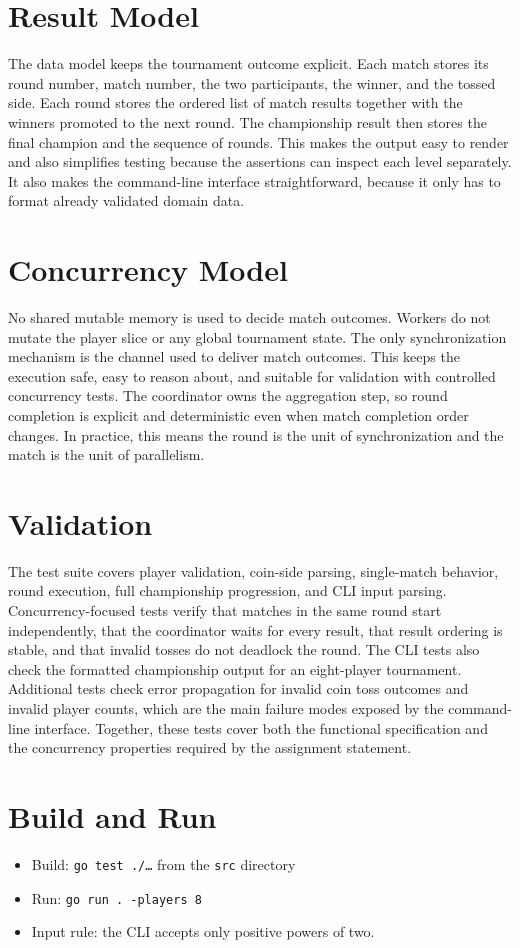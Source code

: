 \documentclass[11pt,a4paper]{article}
\begin{document}
\section*{Result Model}
The data model keeps the tournament outcome explicit.
Each match stores its round number, match number, the two participants, the winner, and the tossed side.
Each round stores the ordered list of match results together with the winners promoted to the next round.
The championship result then stores the final champion and the sequence of rounds.
This makes the output easy to render and also simplifies testing because the assertions can inspect each level separately.
It also makes the command-line interface straightforward, because it only has to format already validated domain data.

\section*{Concurrency Model}
No shared mutable memory is used to decide match outcomes.
Workers do not mutate the player slice or any global tournament state.
The only synchronization mechanism is the channel used to deliver match outcomes.
This keeps the execution safe, easy to reason about, and suitable for validation with controlled concurrency tests.
The coordinator owns the aggregation step, so round completion is explicit and deterministic even when match completion order changes.
In practice, this means the round is the unit of synchronization and the match is the unit of parallelism.

\section*{Validation}
The test suite covers player validation, coin-side parsing, single-match behavior, round execution, full championship progression, and CLI input parsing.
Concurrency-focused tests verify that matches in the same round start independently, that the coordinator waits for every result, that result ordering is stable, and that invalid tosses do not deadlock the round.
The CLI tests also check the formatted championship output for an eight-player tournament.
Additional tests check error propagation for invalid coin toss outcomes and invalid player counts, which are the main failure modes exposed by the command-line interface.
Together, these tests cover both the functional specification and the concurrency properties required by the assignment statement.

\section*{Build and Run}
\begin{itemize}
  \item Build: \texttt{go test ./\ldots{}} from the \texttt{src} directory
  \item Run: \texttt{go run . -players 8}
  \item Input rule: the CLI accepts only positive powers of two.
\end{itemize}
\end{document}
